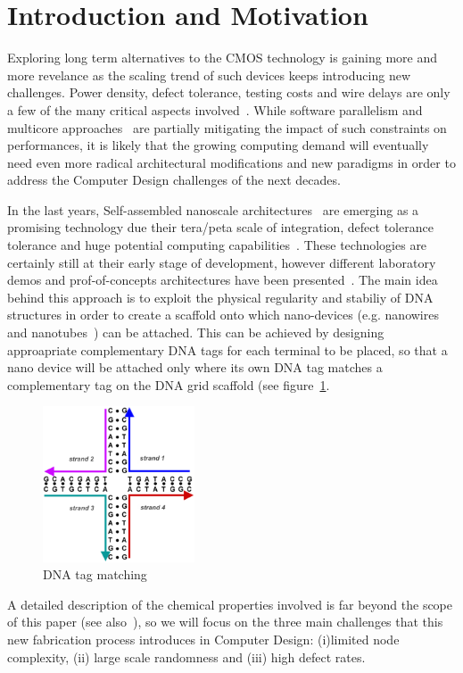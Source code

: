 
\section{Introduction and Motivation}

Exploring long term alternatives to the CMOS technology is gaining
more and more revelance as the scaling trend of such devices keeps
introducing new challenges. Power density, defect tolerance, testing
costs and wire delays are only a few of the many critical aspects
involved~\cite{}. While software parallelism and multicore
approaches~\cite{TODO} are partially mitigating the impact of such
constraints on performances, it is likely that the growing computing demand will
eventually need even more radical architectural modifications and new
paradigms in order to address the Computer Design challenges of the next
decades.

In the last years, Self-assembled nanoscale architectures~\cite{TOOD}
are emerging as a promising technology due their tera/peta scale of
integration, defect tolerance tolerance and huge potential computing
capabilities~\cite{TODO}. These technologies are certainly still at
their early stage of development, however different laboratory demos and
prof-of-concepts architectures have been presented~\cite{TODO}.
The main idea behind this approach is to exploit the physical regularity and
stabiliy of DNA structures in order to create a scaffold onto which
nano-devices (e.g. nanowires and nanotubes~\cite{TODO}) can be
attached. This can be achieved by designing approapriate complementary DNA tags for
each terminal to be placed, so that a nano device will be attached
only where its own DNA tag matches a complementary tag on the DNA grid
scaffold (see figure~\ref{fig:dna_tag}.
\begin{figure}
  \centering
    \includegraphics[width=0.40\textwidth]{pictures/dna_tag.ps}
  \caption{DNA tag matching}
  \label{fig:dna_tag}
\end{figure}
A detailed description of the chemical properties involved is far
beyond the scope of this paper (see also~\cite{}), so we will focus on
the three main challenges that this new fabrication process introduces
in Computer Design: (i)limited node complexity, (ii) large scale
randomness and (iii) high defect rates.  

